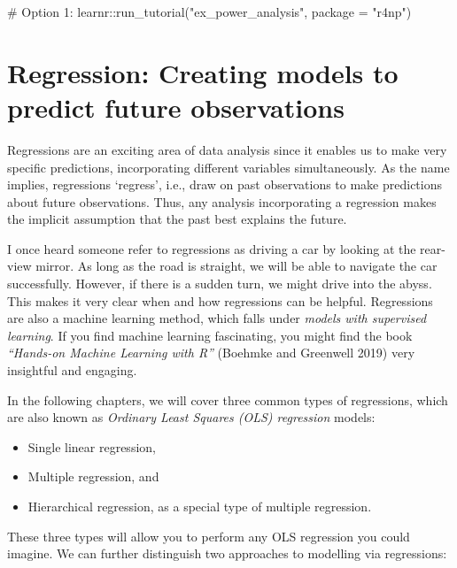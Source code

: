\documentclass[
  letterpaper,
  DIV=11,
  numbers=noendperiod]{scrreprt}
\newenvironment{Shaded}{\begin{snugshade}}{\end{snugshade}}
\newcommand{\AttributeTok}[1]{\textcolor[rgb]{0.40,0.45,0.13}{#1}}
\newcommand{\CommentTok}[1]{\textcolor[rgb]{0.37,0.37,0.37}{#1}}
\newcommand{\FunctionTok}[1]{\textcolor[rgb]{0.28,0.35,0.67}{#1}}
\newcommand{\NormalTok}[1]{\textcolor[rgb]{0.00,0.23,0.31}{#1}}
\newcommand{\SpecialCharTok}[1]{\textcolor[rgb]{0.37,0.37,0.37}{#1}}
\newcommand{\StringTok}[1]{\textcolor[rgb]{0.13,0.47,0.30}{#1}}
\begin{document}
\begin{Shaded}
\begin{Highlighting}[]
\CommentTok{\# Option 1:}
\NormalTok{learnr}\SpecialCharTok{::}\FunctionTok{run\_tutorial}\NormalTok{(}\StringTok{"ex\_power\_analysis"}\NormalTok{, }\AttributeTok{package =} \StringTok{"r4np"}\NormalTok{)}
\end{Highlighting}
\end{Shaded}


\chapter{Regression: Creating models to predict future
observations}\label{sec-regression}

Regressions are an exciting area of data analysis since it enables us to
make very specific predictions, incorporating different variables
simultaneously. As the name implies, regressions `regress', i.e., draw
on past observations to make predictions about future observations.
Thus, any analysis incorporating a regression makes the implicit
assumption that the past best explains the future.

I once heard someone refer to regressions as driving a car by looking at
the rear-view mirror. As long as the road is straight, we will be able
to navigate the car successfully. However, if there is a sudden turn, we
might drive into the abyss. This makes it very clear when and how
regressions can be helpful. Regressions are also a machine learning
method, which falls under \emph{models with supervised learning}. If you
find machine learning fascinating, you might find the book
\emph{``Hands-on Machine Learning with R''} (Boehmke and Greenwell 2019)
very insightful and engaging.

In the following chapters, we will cover three common types of
regressions, which are also known as \emph{Ordinary Least Squares (OLS)
regression} models:

\begin{itemize}
\item
  Single linear regression,
\item
  Multiple regression, and
\item
  Hierarchical regression, as a special type of multiple regression.
\end{itemize}

These three types will allow you to perform any OLS regression you could
imagine. We can further distinguish two approaches to modelling via
regressions:
\end{document}
